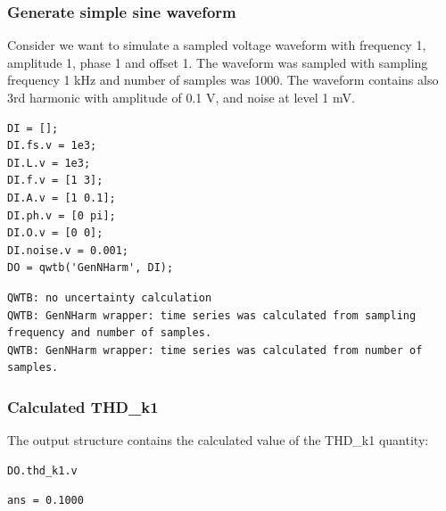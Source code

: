 \startcontents[localtoc]



{}
\subsubsection*{Generate simple sine waveform}



Consider we want to simulate a sampled voltage waveform with frequency 1,
amplitude 1, phase 1 and offset 1. The waveform was sampled with sampling
frequency 1 kHz and number of samples was 1000. The waveform contains also
3rd harmonic with amplitude of 0.1 V, and noise at level 1 mV.

\begin{lstlisting}
DI = [];
DI.fs.v = 1e3;
DI.L.v = 1e3;
DI.f.v = [1 3];
DI.A.v = [1 0.1];
DI.ph.v = [0 pi];
DI.O.v = [0 0];
DI.noise.v = 0.001;
DO = qwtb('GenNHarm', DI);
\end{lstlisting}
\begin{lstlisting}[language={},xleftmargin=5pt,frame=none]
QWTB: no uncertainty calculation
QWTB: GenNHarm wrapper: time series was calculated from sampling frequency and number of samples.
QWTB: GenNHarm wrapper: time series was calculated from number of samples.

\end{lstlisting}


{}
\subsubsection*{Calculated THD\_k1}



The output structure contains the calculated value of the THD\_k1 quantity:

\begin{lstlisting}
DO.thd_k1.v
\end{lstlisting}
\begin{lstlisting}[language={},xleftmargin=5pt,frame=none]
ans = 0.1000

\end{lstlisting}


{}
